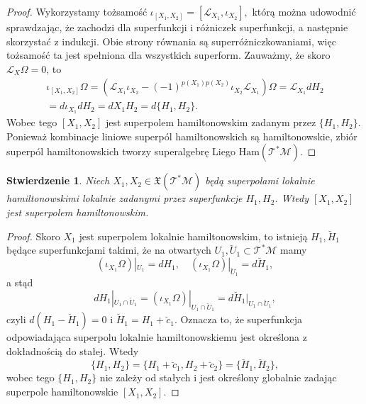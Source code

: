 \documentclass[11pt,a4paper]{report}
\newtheorem{proposition}[theorem]{Stwierdzenie}
\theoremstyle{definition}
\begin{document}
\begin{proof}
 Wykorzystamy tożsamość $\iota_{[X_1,X_2]} = [\mathcal{L}_{X_1}, \iota_{X_2}],$ którą można udowodnić sprawdzając, że zachodzi dla superfunkcji i różniczek superfunkcji, a następnie skorzystać z indukcji. Obie strony równania są superróżniczkowaniami, więc tożsamość ta jest spełniona dla wszystkich superform.
 Zauważmy, że skoro $\mathcal{L}_X \Omega = 0$, to
 \begin{equation*}
 \begin{gathered}
  \iota_{[X_1,X_2]}\Omega=(\mathcal{L}_{X_1}\iota_{X_2}-(-1)^{p(X_1)p(X_2)}\iota_{X_2}\mathcal{L}_{X_1})\Omega  = \mathcal{L}_{X_1} dH_2 \\
  = d \iota_{X_1} dH_2 = dX_1H_2=d\{H_1,H_2\}.
 \end{gathered}
 \end{equation*}
 Wobec tego $[X_1, X_2]$ jest superpolem hamiltonowskim zadanym przez $\{ H_1, H_2 \}.$ Ponieważ kombinacje liniowe superpól hamiltonowskich są hamiltonowskie, zbiór superpól hamiltonowskich tworzy superalgebrę Liego $\mathrm{Ham}(\mathcal{T^*M}).$
\end{proof}

\begin{proposition}
 Niech $X_1, X_2\in \mathfrak{X}(\mathcal{T^*M})$ będą superpolami lokalnie hamiltonowskimi lokalnie zadanymi przez superfunkcje $H_1, H_2$. Wtedy $[X_1, X_2]$ jest superpolem hamiltonowskim.
\end{proposition}

\begin{proof}
 Skoro $X_1$ jest superpolem lokalnie hamiltonowskim, to istnieją $H_1, \breve{H}_1$ będące superfunkcjami takimi, że na otwartych $U_1, \breve{U}_1 \subset \mathcal{T^*M}$ mamy
 \begin{equation*}
  \left( \iota_{X_1} \Omega \right) |_{U_1} = dH_1, \quad 
  \left( \iota_{X_1} \Omega \right) |_{\breve{U}_1} = d\breve{H}_1,
 \end{equation*}
 a stąd
 \begin{equation*}
  dH_1|_{U_1 \cap \breve{U}_1} = \left( \iota_{X_1} \Omega \right) |_{U_1 \cap \breve{U}_1} = d\breve{H}_1|_{U_1 \cap \breve{U}_1},
 \end{equation*}
 czyli $d(H_1 - \breve{H}_1) = 0$ i $\breve{H}_1 = H_1 + \breve{c}_1$. Oznacza to, że superfunkcja odpowiadająca superpolu lokalnie hamiltonowskiemu jest określona z dokładnością do stałej. Wtedy
 \begin{equation*}
  \{ H_1, H_2 \} = \{ H_1 + \breve{c}_1, H_2 + \breve{c}_2 \} = \{ \breve{H}_1, \breve{H}_2 \},
 \end{equation*}
 wobec tego $\{ H_1, H_2 \}$ nie zależy od stałych i jest określony globalnie zadając superpole hamiltonowskie $[X_1, X_2]$.
\end{proof}
\end{document}
